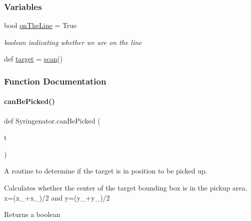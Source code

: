 \subsubsection*{Variables}
\begin{DoxyCompactItemize}
\item 
bool \mbox{\hyperlink{namespaceSyringenator_a161fa877b77c9ebb120c1ed20739260b}{on\+The\+Line}} = True
\begin{DoxyCompactList}\small\item\em boolean indicating whether we are on the line \end{DoxyCompactList}\item 
def \mbox{\hyperlink{namespaceSyringenator_a66c7999289f77a4adce05169661f9660}{target}} = \mbox{\hyperlink{namespaceSyringenator_aff01237d3ff3e33f0ffc32927d813df0}{scan}}()
\end{DoxyCompactItemize}


\subsubsection{Function Documentation}
\mbox{\label{namespaceSyringenator_acb08d40f080a03cb4e7a43ee3ab4854b}} 
\paragraph{\texorpdfstring{canBePicked()}{canBePicked()}}
{\footnotesize\ttfamily def Syringenator.\+can\+Be\+Picked (\begin{DoxyParamCaption}\item[{}]{t }\end{DoxyParamCaption})}



A routine to determine if the target is in position to be picked up. 

Calculates whether the center of the target bounding box is in the pickup area. x=(x\+\_+x\+\_)/2 and y=(y\+\_+y\+\_)/2

\begin{DoxyReturn}{Returns}
a boolean 
\end{DoxyReturn}
\mbox{\label{namespaceSyringenator_a824ef6e71bc0975483435ffbdd58cb3e}} 
